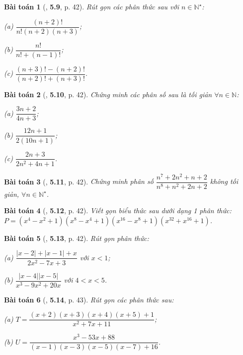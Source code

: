 \documentclass{article}
\numberwithin{equation}{section}
\newtheorem{baitoan}{Bài toán}
\begin{document}
\begin{baitoan}[\cite{Binh_Nam_Ngoc_Son_Toan_8_Dai_So}, \textbf{5.9}, p. 42]
	Rút gọn các phân thức sau với $n\in\mathbb{N}^\star$:
	\begin{enumerate*}
		\item[(a)] $\dfrac{(n + 2)!}{n!(n + 2)(n + 3)}$;
		\item[(b)] $\dfrac{n!}{n! + (n - 1)!}$;
		\item[(c)] $\dfrac{(n + 3)! - (n + 2)!}{(n + 2)! + (n + 3)!}$.
	\end{enumerate*}
\end{baitoan}

\begin{baitoan}[\cite{Binh_Nam_Ngoc_Son_Toan_8_Dai_So}, \textbf{5.10}, p. 42]
	Chứng minh các phân số sau là tối giản $\forall n\in\mathbb{N}$:
	\begin{enumerate*}
		\item[(a)] $\dfrac{3n + 2}{4n + 3}$;
		\item[(b)] $\dfrac{12n + 1}{2(10n + 1)}$;
		\item[(c)] $\dfrac{2n + 3}{2n^2 + 4n + 1}$.
	\end{enumerate*}
\end{baitoan}

\begin{baitoan}[\cite{Binh_Nam_Ngoc_Son_Toan_8_Dai_So}, \textbf{5.11}, p. 42]
	Chứng minh phân số $\dfrac{n^7 + 2n^2 + n + 2}{n^8 + n^2 + 2n + 2}$ không tối giản, $\forall n\in\mathbb{N}^\star$.
\end{baitoan}

\begin{baitoan}[\cite{Binh_Nam_Ngoc_Son_Toan_8_Dai_So}, \textbf{5.12}, p. 42]
	Viết gọn biểu thức sau dưới dạng 1 phân thức: $P = (x^4 - x^2 + 1)(x^8 - x^4 + 1)(x^{16} - x^8 + 1)(x^{32} + x^{16} + 1)$.
\end{baitoan}

\begin{baitoan}[\cite{Binh_Nam_Ngoc_Son_Toan_8_Dai_So}, \textbf{5.13}, p. 42]
	Rút gọn phân thức:
	\begin{enumerate*}
		\item[(a)] $\dfrac{|x - 2| + |x - 1| + x}{2x^2 - 7x + 3}$ với $x < 1$;
		\item[(b)] $\dfrac{|x - 4||x - 5|}{x^3 - 9x^2 + 20x}$ với $4 < x < 5$.
	\end{enumerate*}
\end{baitoan}

\begin{baitoan}[\cite{Binh_Nam_Ngoc_Son_Toan_8_Dai_So}, \textbf{5.14}, p. 43]
	Rút gọn các phân thức sau:
	\begin{enumerate*}
		\item[(a)] $T = \dfrac{(x + 2)(x + 3)(x + 4)(x + 5) + 1}{x^2 + 7x + 11}$;
		\item[(b)] $U = \dfrac{x^3 - 53x + 88}{(x - 1)(x - 3)(x - 5)(x - 7) + 16}$.
	\end{enumerate*}
\end{baitoan}
\end{document}

